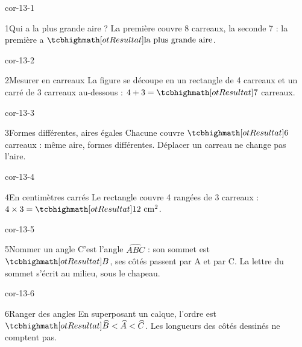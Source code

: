 \clearpage\pagestyle{otMain}\setlength{\otBlocEspacement}{2.5mm}\fontsize{11}{15}\selectfont{}
\begin{blocLivre}{cor-13-1}\begin{corrige}{1}{Qui a la plus grande aire ?}
La première couvre 8 carreaux, la seconde 7 : la première a $\res{\text{la plus grande aire}}$.
\label{fig-cor-13-1}
\end{corrige}\end{blocLivre}
\begin{blocLivre}{cor-13-2}\begin{corrige}{2}{Mesurer en carreaux}
La figure se découpe en un rectangle de 4 carreaux et un carré de 3 carreaux au-dessous : $4+3=\res7$ carreaux.
\label{fig-cor-13-2}
\end{corrige}\end{blocLivre}
\begin{blocLivre}{cor-13-3}\begin{corrige}{3}{Formes différentes, aires égales}
Chacune couvre $\res6$ carreaux : même aire, formes différentes. Déplacer un carreau ne change pas l’aire.
\label{fig-cor-13-3}
\end{corrige}\end{blocLivre}
\begin{blocLivre}{cor-13-4}\begin{corrige}{4}{En centimètres carrés}
Le rectangle couvre 4 rangées de 3 carreaux : $4\times3=\res{12\ \mathrm{cm}^2}$.
\label{fig-cor-13-4}
\end{corrige}\end{blocLivre}
\begin{blocLivre}{cor-13-5}\begin{corrige}{5}{Nommer un angle}
C’est l’angle $\widehat{ABC}$ : son sommet est $\res B$, ses côtés passent par A et par C. La lettre du sommet s’écrit au milieu, sous le chapeau.
\label{fig-cor-13-5}
\end{corrige}\end{blocLivre}
\begin{blocLivre}{cor-13-6}\begin{corrige}{6}{Ranger des angles}
En superposant un calque, l’ordre est $\res{\widehat{B}<\widehat{A}<\widehat{C}}$. Les longueurs des côtés dessinés ne comptent pas.
\label{fig-cor-13-6}
\end{corrige}\end{blocLivre}
